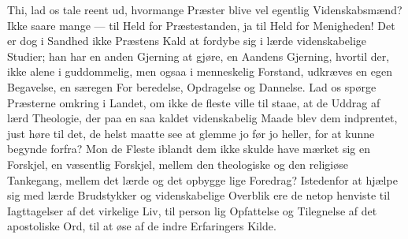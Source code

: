 \documentclass[12pt]{book}
\begin{document}
Thi, lad os tale reent ud, hvormange Præster blive
vel egentlig Videnskabsmænd? Ikke saare mange --- til
Held for Præstestanden, ja til Held for Menigheden!
Det er dog i Sandhed ikke Præstens Kald at fordybe
sig i lærde videnskabelige Studier; han har en anden
Gjerning at gjøre, en Aandens Gjerning, hvortil der,
ikke alene i guddommelig, men ogsaa i menneskelig
Forstand, udkræves en egen Begavelse, en særegen For\-%
beredelse, Opdragelse og Dannelse. Lad os spørge
Præsterne omkring i Landet, om ikke de fleste ville til\-%
staae, at de Uddrag af lærd Theologie, der paa en saa\-%
kaldet videnskabelig Maade blev dem indprentet, just
høre til det, de helst maatte see at glemme jo før jo
heller, for at kunne begynde forfra? Mon de Fleste
iblandt dem ikke skulde have mærket sig en Forskjel,
en væsentlig Forskjel, mellem den theologiske og den
religiøse Tankegang, mellem det lærde og det opbygge\-%
lige Foredrag? Istedenfor at hjælpe sig med lærde
Brudstykker og videnskabelige Overblik ere de netop
henviste til Iagttagelser af det virkelige Liv, til person\-%
lig Opfattelse og Tilegnelse af det apostoliske Ord, til
at øse af de indre Erfaringers Kilde.
\end{document}
